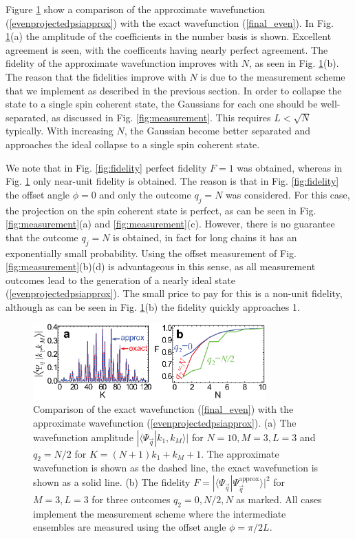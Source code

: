 \documentclass[12pt]{iopart}
\begin{document}
Figure \ref{fig:finalfig} show a comparison of the approximate wavefunction (\ref{evenprojectedpsiapprox}) with the exact wavefunction (\ref{final_even}).  In Fig. \ref{fig:finalfig}(a) the amplitude of the coefficients in the number basis is shown.  Excellent agreement is seen, with the coefficents having nearly perfect agreement.  The fidelity of the approximate wavefunction improves with $ N $, as seen in Fig. \ref{fig:finalfig}(b).  The reason that the fidelities improve with $ N $ is due to the measurement scheme that we implement as described in the previous section.  In order to collapse the state to a single spin coherent state, the Gaussians for each one should be well-separated, as discussed in Fig. \ref{fig:measurement}.  This requires $ L < \sqrt{N} $ typically. With increasing $ N $, the Gaussian become better separated and approaches the ideal collapse to a single spin coherent state.  

We note that in Fig. \ref{fig:fidelity} perfect fidelity $ F = 1$ was obtained, whereas in Fig. \ref{fig:finalfig} only near-unit fidelity is obtained.  The reason is that in Fig. \ref{fig:fidelity} the offset angle $ \phi = 0 $ and only the outcome $ q_j = N $ was considered.  For this case, the projection on the spin coherent state is perfect, as can be seen in Fig. \ref{fig:measurement}(a) and \ref{fig:measurement}(c).  However, there is no guarantee that the outcome $q_j = N$ is obtained, in fact for long chains it has an exponentially small probability.  Using the offset measurement of Fig. \ref{fig:measurement}(b)(d) is advantageous in this sense, as all measurement outcomes lead to the generation of a nearly ideal state (\ref{evenprojectedpsiapprox}).  The small price to pay for this is a non-unit fidelity, although as can be seen in Fig. \ref{fig:finalfig}(b) the fidelity quickly approaches 1.  






\begin{figure}[ht]
    \centering
    \includegraphics[width=0.8\textwidth]{finalfid}
    \caption{Comparison of the exact wavefunction (\ref{final_even}) with the approximate wavefunction (\ref{evenprojectedpsiapprox}).  (a) The wavefunction amplitude $ | \langle \Psi_{\vec{q}} | k_1, k_M \rangle | $ for $N = 10, M= 3, L = 3 $ and $ q_2 = N/2 $ for $ K = (N+1) k_1 + k_M +1 $.  The approximate wavefunction is shown as the dashed line, the exact wavefunction is shown as a solid line. (b) The fidelity $ F = |\langle \Psi_{\vec{q}} | \Psi_{\vec{q}}^{\mathrm{approx}} \rangle |^2 $ for $ M = 3, L = 3$ for three outcomes $ q_2 = 0, N/2, N $ as marked. All cases implement the measurement scheme where the intermediate ensembles are measured using the offset angle $ \phi = \pi/2L $.
    }
    \label{fig:finalfig}
\end{figure}
\end{document}
